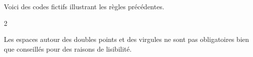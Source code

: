 \documentclass[10pt, a4paper]{tutodoc}
\begin{document}
Voici des codes fictifs illustrant les règles précédentes.
\begin{multicols}{2}


\end{multicols}




\begin{tdocnote}
    Les espaces autour des doubles points et des virgules ne sont pas obligatoires bien que conseillés pour des raisons de lisibilité.
\end{tdocnote}
\end{document}
